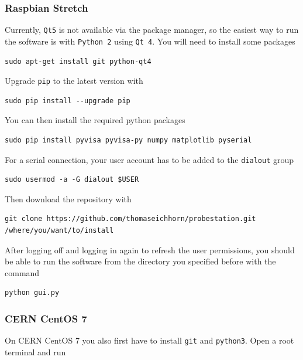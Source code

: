 \documentclass[a4paper]{article}
\begin{document}
\subsubsection{Raspbian Stretch}

Currently, {\tt Qt5} is not available via the package manager, so the easiest way to run the software is with {\tt Python 2} using {\tt Qt 4}.
You will need to install some packages

\medskip
\begin{lstlisting}
sudo apt-get install git python-qt4
\end{lstlisting}
\medskip

Upgrade {\tt pip} to the latest version with

\medskip
\begin{lstlisting}
sudo pip install --upgrade pip
\end{lstlisting}
\medskip

You can then install the required python packages

\medskip
\begin{lstlisting}
sudo pip install pyvisa pyvisa-py numpy matplotlib pyserial
\end{lstlisting}
\medskip

For a serial connection, your user account has to be added to the {\tt dialout} group

\medskip
\begin{lstlisting}
sudo usermod -a -G dialout $USER
\end{lstlisting}
\medskip

Then download the repository with

\medskip
\begin{lstlisting}
git clone https://github.com/thomaseichhorn/probestation.git /where/you/want/to/install
\end{lstlisting}
\medskip

After logging off and logging in again to refresh the user permissions, you should be able to run the software from the directory you specified before with the command

\medskip
\begin{lstlisting}
python gui.py
\end{lstlisting}
\medskip

\subsubsection{CERN CentOS 7}

On CERN CentOS 7 you also first have to install {\tt git} and {\tt python3}.
Open a root terminal and run
\end{document}
